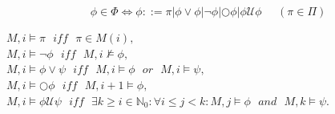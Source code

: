 \documentclass{beamer}
\begin{document}
\section{}

\begin{frame}{}
\begin{flushright}
	\begin{block}{}
		\vspace{-0.75 cm}
		\begin{center}
		$$
		\phi \in \Phi \Leftrightarrow
		\phi ::= \pi | \phi \lor \phi |
		\neg \phi |
		\bigcirc \phi |
		\phi \mathcal{U}\phi \;\;\;\;\;(\pi \in \Pi) 
		$$	
		\end{center}
	\end{block}	
\pause
	\begin{block}{}
		\vspace{-0.5 cm}
		\begin{center}
		$	M,i \models \pi \:\:\: \mathit{iff} \:\:\: \pi \in M(i),$\\
		$	M,i \models \neg \phi \:\:\: \mathit{iff} \:\:\: M,i\nvDash \phi,$\\
		$	M,i \models \phi \lor \psi \:\:\: \mathit{iff} \:\:\: M,i \models \phi \:\:\: \mathit{or} \:\:\: M,i \models \psi,$\\
		$M,i \models \bigcirc \phi  \:\:\:  \mathit{iff} \:\:\: M,i+1 \models \phi,$\\
		$M,i \models \phi \mathcal{U} \psi \:\:\: \mathit{iff} \:\:\: 
		\exists k \geq i \in \mathbb{N}_0: \forall i\leq j< k: M,j \models \phi \:\:\: \mathit{and} \:\:\: M,k \models \psi.$
		\end{center}	
\end{block}
\end{flushright}
\end{frame}
\end{document}
